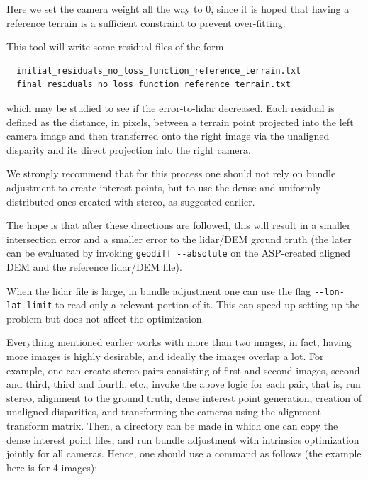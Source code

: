 Here we set the camera weight all the way to 0, since it is hoped that having
a reference terrain is a sufficient constraint to prevent over-fitting.

This tool will write some residual files of the form 
\begin{verbatim}
  initial_residuals_no_loss_function_reference_terrain.txt
  final_residuals_no_loss_function_reference_terrain.txt
\end{verbatim}

which may be studied to see if the error-to-lidar decreased. Each
residual is defined as the distance, in pixels, between a terrain point
projected into the left camera image and then transferred onto the right
image via the unaligned disparity and its direct projection into the
right camera.

We strongly recommend that for this process one should not rely on bundle adjustment
to create interest points, but to use the dense and uniformly distributed ones 
created with stereo, as suggested earlier. 

The hope is that after these directions are followed, this will result in a smaller intersection
error and a smaller error to the lidar/DEM ground truth (the later can be evaluated by
invoking \texttt{geodiff -\/-absolute} on the ASP-created aligned DEM
and the reference lidar/DEM file).

When the lidar file is large, in bundle adjustment one can use the flag
\texttt{-\/-lon-lat-limit} to read only a relevant portion of it. This
can speed up setting up the problem but does not affect the
optimization.

Everything mentioned earlier works with more than two images, in fact,
having more images is highly desirable, and ideally the images overlap a
lot. For example, one can create stereo pairs consisting of first and
second images, second and third, third and fourth, etc., invoke the above logic for each
pair, that is, run stereo, alignment to the ground truth, dense interest
point generation, creation of unaligned disparities, and transforming the cameras using the alignment
transform matrix. Then, a directory can be made in which one can
copy the dense interest point files, and run bundle adjustment with intrinsics optimization
jointly for all cameras. Hence, one should use a command as follows
(the example here is for 4 images):

